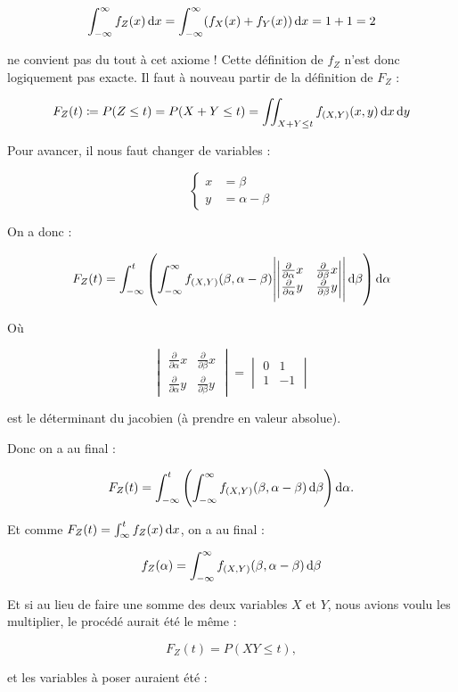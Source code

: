\documentclass{article}
\renewcommand{\pd}[1]{\frac {\partial}{\partial #1}}
\begin{document}
			\[\int_{-\infty}^\infty f_Z(x)\dif x = \int_{-\infty}^\infty(f_X(x) + f_Y(x))\dif x = 1 + 1 = 2\]

			ne convient pas du tout à cet axiome ! Cette définition de $f_Z$ n'est donc logiquement pas exacte. Il faut à nouveau partir de la définition de $F_Z$ :

			\[F_Z(t) \coloneqq P(Z \leq t) = P(X+Y \leq t) = \iint_{X+Y \leq t}f_{(X, Y)}(x, y)\dif x\dif y\]

			Pour avancer, il nous faut changer de variables :

			\[\left\{\begin{aligned}
				x &= \beta\\
				y  &= \alpha - \beta
			\end{aligned}\right.\]

			On a donc :

			\[F_Z(t) = \int_{-\infty}^t\left(\int_{-\infty}^\infty f_{(X, Y)}(\beta, \alpha-\beta)\abs{\begin{vmatrix}\pd \alpha x & \pd \beta x \\ \pd \alpha y & \pd \beta y\end{vmatrix}}\dif \beta\right)\dif\alpha\]

			Où

			\[\begin{vmatrix}\pd \alpha x & \pd \beta x \\ \pd \alpha y & \pd \beta y\end{vmatrix} = \begin{vmatrix}0 & 1 \\1 & -1\end{vmatrix}\]

			est le déterminant du jacobien (à prendre en valeur absolue).

			Donc on a au final :

			\[F_Z(t) = \int_{-\infty}^t\left(\int_{-\infty}^\infty f_{(X, Y)}(\beta, \alpha - \beta)\dif \beta\right)\dif \alpha.\]

			Et comme $F_Z(t) = \int_{\infty}^t f_Z(x)\dif x$, on a au final :

			\[f_Z(\alpha) = \int_{-\infty}^\infty f_{(X, Y)}(\beta, \alpha-\beta)\dif \beta\]

			Et si au lieu de faire une somme des deux variables $X$ et $Y$, nous avions voulu les multiplier, le procédé aurait été le même :

			\[F_Z(t) = P(XY \leq t),\]

			et les variables à poser auraient été :
\end{document}

